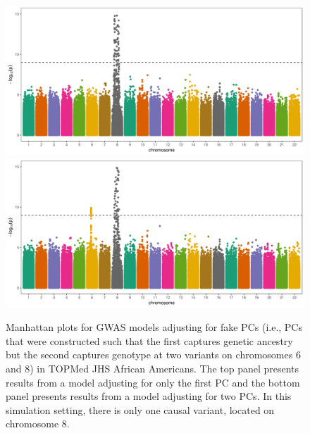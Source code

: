 \documentclass[12pt]{article}
\begin{document}
\begin{figure}[!htb]
\centering
\includegraphics[width=\textwidth]{figs/fakepcs/beta2_1pcs_fake_manh}
\includegraphics[width=\textwidth]{figs/fakepcs/beta2_2pcs_fake_manh}
\caption[Manhattan plots for GWAS models adjusting for fake PCs in TOPMed JHS.]{Manhattan plots for GWAS models adjusting for fake PCs (i.e., PCs that were constructed such that the first captures genetic ancestry but the second captures genotype at two variants on chromosomes 6 and 8) in TOPMed JHS African Americans. The top panel presents results from a model adjusting for only the first PC and the bottom panel presents results from a model adjusting for two PCs. In this simulation setting, there is only one causal variant, located on chromosome 8.}
\label{fig:manh-fake}
\end{figure}
\end{document}

